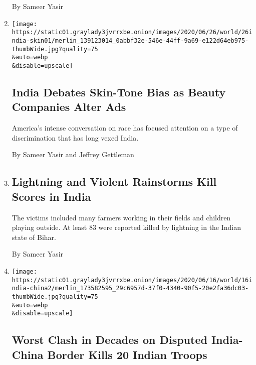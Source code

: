 \begin{enumerate}
  By Sameer Yasir
\item
  \href{/2020/06/28/world/asia/india-skin-color-unilever.html}{}

  \texttt{[image: https://static01.graylady3jvrrxbe.onion/images/2020/06/26/world/26india-skin01/merlin\_139123014\_0abbf32e-546e-44ff-9a69-e122d64eb975-thumbWide.jpg?quality=75\\\&auto=webp\\\&disable=upscale]}

  \hypertarget{india-debates-skin-tone-bias-as-beauty-companies-alter-ads}{%
  \subsection{India Debates Skin-Tone Bias as Beauty Companies Alter
  Ads}\label{india-debates-skin-tone-bias-as-beauty-companies-alter-ads}}

  America's intense conversation on race has focused attention on a type
  of discrimination that has long vexed India.

  By Sameer Yasir and Jeffrey Gettleman
\item
  \href{/2020/06/25/world/asia/india-monsoon-lightning-rainstorms.html}{}

  \hypertarget{lightning-and-violent-rainstorms-kill-scores-in-india}{%
  \subsection{Lightning and Violent Rainstorms Kill Scores in
  India}\label{lightning-and-violent-rainstorms-kill-scores-in-india}}

  The victims included many farmers working in their fields and children
  playing outside. At least 83 were reported killed by lightning in the
  Indian state of Bihar.

  By Sameer Yasir
\item
  \href{/2020/06/16/world/asia/indian-china-border-clash.html}{}

  \texttt{[image: https://static01.graylady3jvrrxbe.onion/images/2020/06/16/world/16india-china2/merlin\_173582595\_29c6957d-37f0-4340-90f5-20e2fa36dc03-thumbWide.jpg?quality=75\\\&auto=webp\\\&disable=upscale]}

  \hypertarget{worst-clash-in-decades-on-disputed-india-china-border-kills-20-indian-troops}{%
  \subsection{Worst Clash in Decades on Disputed India-China Border
  Kills 20 Indian
  Troops}\label{worst-clash-in-decades-on-disputed-india-china-border-kills-20-indian-troops}}


\end{enumerate}
